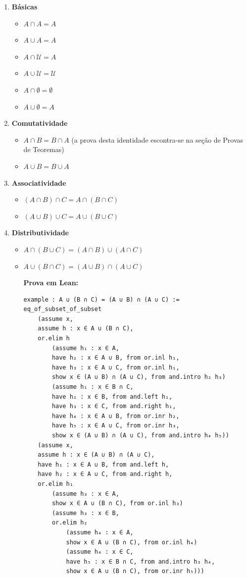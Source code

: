 \begin{enumerate}
  \item{\textbf{Básicas}}
  \begin{itemize}
  \item $A \cap A = A$
  \item $A \cup A = A$
  \item $A \cap \mathcal U = A$
  \item $A \cup \mathcal U = \mathcal U$
  \item $A \cap \emptyset = \emptyset$
  \item $A \cup \emptyset = A$
  \end{itemize}

  \item{\textbf{Comutatividade}}
  \begin{itemize}
  \item $A \cap B = B \cap A$ (a prova desta identidade escontra-se na seção de Provas de Teoremas)
  \item $A \cup B = B \cup A$
  \end{itemize}

  \item{\textbf{Associatividade}}
  \begin{itemize}
  \item $(A \cap B) \cap C = A \cap (B \cap C)$
  \item $(A \cup B) \cup C = A \cup (B \cup C)$
  \end{itemize}

  \item{\textbf{Distributividade}}
  \begin{itemize}
  \item $A \cap (B \cup C) = (A \cap B) \cup (A \cap C)$
  \item $A \cup (B \cap C) = (A \cup B) \cap (A \cup C)$

\textbf{Prova em Lean:}
\begin{lstlisting}
example : A ∪ (B ∩ C) = (A ∪ B) ∩ (A ∪ C) :=
eq_of_subset_of_subset
    (assume x,
    assume h : x ∈ A ∪ (B ∩ C),
    or.elim h
        (assume h₁ : x ∈ A,
        have h₂ : x ∈ A ∪ B, from or.inl h₁,
        have h₃ : x ∈ A ∪ C, from or.inl h₁,
        show x ∈ (A ∪ B) ∩ (A ∪ C), from and.intro h₂ h₃)
        (assume h₁ : x ∈ B ∩ C,
        have h₂ : x ∈ B, from and.left h₁,
        have h₃ : x ∈ C, from and.right h₁,
        have h₄ : x ∈ A ∪ B, from or.inr h₂,
        have h₅ : x ∈ A ∪ C, from or.inr h₃,
        show x ∈ (A ∪ B) ∩ (A ∪ C), from and.intro h₄ h₅))
    (assume x,
    assume h : x ∈ (A ∪ B) ∩ (A ∪ C),
    have h₁ : x ∈ A ∪ B, from and.left h,
    have h₂ : x ∈ A ∪ C, from and.right h,
    or.elim h₁
        (assume h₃ : x ∈ A,
        show x ∈ A ∪ (B ∩ C), from or.inl h₃)
        (assume h₃ : x ∈ B,
        or.elim h₂
            (assume h₄ : x ∈ A,
            show x ∈ A ∪ (B ∩ C), from or.inl h₄)
            (assume h₄ : x ∈ C,
            have h₅ : x ∈ B ∩ C, from and.intro h₃ h₄,
            show x ∈ A ∪ (B ∩ C), from or.inr h₅))) \end{lstlisting}


\end{itemize}
\end{enumerate}
